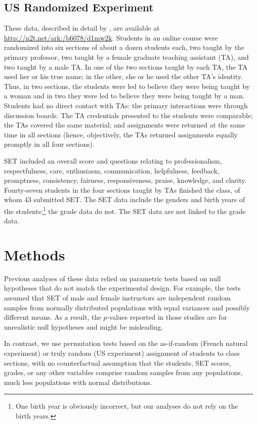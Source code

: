\documentclass[12pt]{article}
\begin{document}
\subsection{US Randomized Experiment}
These data, described in detail by \cite{MacNell2014}, are available at 
\url{http://n2t.net/ark:/b6078/d1mw2k}.
Students in an online course were randomized into six sections of about a dozen students each, 
two taught by the primary professor,
two taught by a female graduate teaching assistant (TA), and two taught by a male TA.
In one of the two sections taught by each TA, the TA used her or his
true name; in the other, she or he used the other TA's identity.
Thus, in two sections, the students were led to believe they were being taught by a woman
and in two they were led to believe they were being taught by a man.
Students had no direct contact with TAs: the primary interactions were through
discussion boards.
The TA credentials presented to the students were comparable; the TAs covered
the same material; and assignments were returned at the same time in all sections
(hence, objectively, the TAs returned assignments equally promptly in all four sections).

SET included an overall score and questions relating to
professionalism, respectfulness, care, enthusiasm, communication, helpfulness,
feedback, promptness, consistency, fairness, responsiveness, praise, knowledge, 
and clarity.
Fourty-seven students in the four sections taught by TAs finished the class,
of whom 43 submitted SET.
The SET data include the genders and birth years of the students;\footnote{%
One birth year is obviously incorrect, but our analyses do not rely on the birth years.
}%
the grade data do not.
The SET data are not linked to the grade data.

\section{Methods} \label{sec:methods}
Previous analyses of these data relied on parametric tests based on null
hypotheses that do not match the experimental design.
For example, the tests assumed that SET of male and female instructors
are independent random samples from normally distributed populations with 
equal variances and possibly different means.
As a result, the $p$-values reported in those studies are for unrealistic
null hypotheses and might be misleading.

In contrast, we use permutation tests based on the as-if-random (French natural experiment)
or truly random (US experiment) assignment of students
to class sections, with no counterfactual assumption that the students, SET scores,
grades, or any other variables comprise random samples from any populations, much
less populations with normal distributions.
\end{document}
